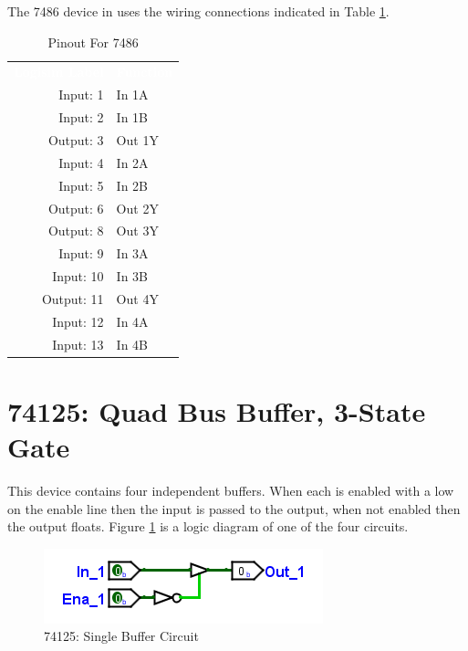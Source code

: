 The 7486 device in \LE uses the wiring connections indicated in Table \ref{tab:50-7486}.

\begin{table}[H]
	\sffamily
	\newcommand{\head}[1]{\textcolor{white}{\textbf{#1}}}		
	\begin{center}
		\begin{tabular}{rl} 
			\rowcolor{black!75}
			\head{Logisim Label} & \head{Function} \\
			Input: 1   & In 1A  \\
			Input: 2   & In 1B  \\
			Output: 3  & Out 1Y \\
			Input: 4   & In 2A  \\
			Input: 5   & In 2B  \\
			Output: 6  & Out 2Y \\
			Output: 8  & Out 3Y \\
			Input: 9   & In 3A  \\
			Input: 10  & In 3B  \\
			Output: 11 & Out 4Y \\
			Input: 12  & In 4A  \\
			Input: 13  & In 4B  \\
		\end{tabular}
	\end{center}
	\caption{Pinout For 7486}
	\label{tab:50-7486}
\end{table}

\section{74125: Quad Bus Buffer, 3-State Gate}

This device contains four independent buffers. When each is enabled with a low on the enable line then the input is passed to the output, when not enabled then the output floats. Figure \ref{fig:app_ttl-74125} is a logic diagram of one of the four circuits.

\begin{figure}[H]
	\centering
	\includegraphics{gfx/app_ttl-74125}
	\caption{74125: Single Buffer Circuit}
	\label{fig:app_ttl-74125}
\end{figure}

